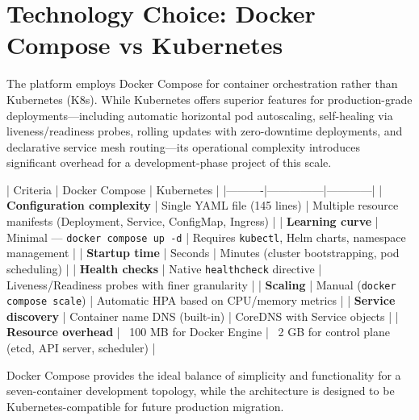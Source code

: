\section{Technology Choice: Docker Compose vs Kubernetes}

The platform employs Docker Compose for container orchestration rather than Kubernetes (K8s). While Kubernetes offers superior features for production-grade deployments—including automatic horizontal pod autoscaling, self-healing via liveness/readiness probes, rolling updates with zero-downtime deployments, and declarative service mesh routing—its operational complexity introduces significant overhead for a development-phase project of this scale.

| Criteria | Docker Compose | Kubernetes |
|----------|---------------|------------|
| \textbf{Configuration complexity} | Single YAML file (145 lines) | Multiple resource manifests (Deployment, Service, ConfigMap, Ingress) |
| \textbf{Learning curve} | Minimal — \texttt{docker compose up -d} | Requires \texttt{kubectl}, Helm charts, namespace management |
| \textbf{Startup time} | Seconds | Minutes (cluster bootstrapping, pod scheduling) |
| \textbf{Health checks} | Native \texttt{healthcheck} directive | Liveness/Readiness probes with finer granularity |
| \textbf{Scaling} | Manual (\texttt{docker compose scale}) | Automatic HPA based on CPU/memory metrics |
| \textbf{Service discovery} | Container name DNS (built-in) | CoreDNS with Service objects |
| \textbf{Resource overhead} | ~100 MB for Docker Engine | ~2 GB for control plane (etcd, API server, scheduler) |

Docker Compose provides the ideal balance of simplicity and functionality for a seven-container development topology, while the architecture is designed to be Kubernetes-compatible for future production migration.
